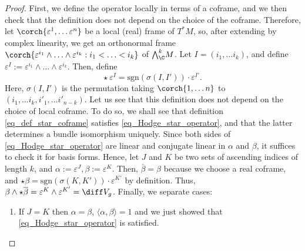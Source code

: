 \begin{proof}
    First, we define the operator locally in terms of a coframe, and we then check that the definition does not depend on the choice of the coframe. Therefore, let \(\corch{\varepsilon^1, \ldots \varepsilon^n}\) be a local (real) frame of \(T^*M\), so, after extending by complex linearity, we get an orthonormal frame \(\corch{\varepsilon^{i_1} \wedge \ldots \wedge \varepsilon^{i_k}: i_1 < \ldots < i_k}\) of \({\bigwedge}^k_\C M\). Let \(I=(i_1, \ldots i_k)\), and define \(\varepsilon^I:=\varepsilon^{i_1} \wedge \ldots \wedge \varepsilon^{i_k}\). Then, define
    \begin{equation} \label{eq_def_star_coframe}
    \star \ \varepsilon^I= \mathrm{sgn}(\sigma(I,I'))\cdot \varepsilon^{I'}.
    \end{equation}
    Here, \(\sigma(I,I')\) is the permutation taking \(\corch{1, \ldots n}\) to \((i_1, \ldots i_k, i'_1, \ldots i'_{n-k})\). Let us see that this definition does not depend on the choice of local coframe. To do so, we shall see that definition \eqref{eq_def_star_coframe} satisfies \eqref{eq_Hodge_star_operator}, and that the latter determines a bundle isomorphism uniquely. Since both sides of \eqref{eq_Hodge_star_operator} are linear and conjugate linear in \(\alpha\) and \(\beta\), it suffices to check it for basis forms. Hence, let \(J\) and \(K\) be two sets of ascending indices of length \(k\), and \(\alpha:=\varepsilon^J, \beta :=\varepsilon^K\). Then, \(\overline{\beta}=\beta\) because we choose a real coframe, and \(\star \beta = \mathrm{sgn}(\sigma(K,K'))\cdot \varepsilon^{K'}\) by definition. Thus, \(\beta \wedge \star \overline{\beta}=\varepsilon^K \wedge \varepsilon^{K'}=\diff V_g\). Finally, we separate cases:
    \begin{enumerate}
        \item If \(J=K\) then \(\alpha=\beta\), \(\langle \alpha, \beta\rangle = 1\) and we just showed that \eqref{eq_Hodge_star_operator} is satisfied.

\end{enumerate}
\end{proof}

